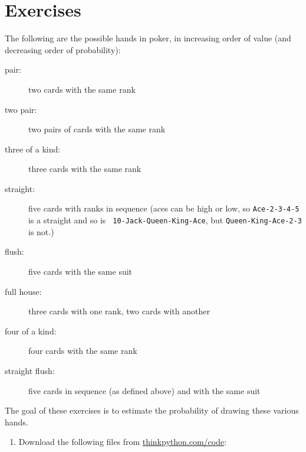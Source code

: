 \section{Exercises}

\begin{exercise}


The following are the possible hands in poker, in increasing order
of value (and decreasing order of probability):

\begin{description}

\item[pair:] two cards with the same rank
\vspace{-0.05in}

\item[two pair:] two pairs of cards with the same rank
\vspace{-0.05in}

\item[three of a kind:] three cards with the same rank
\vspace{-0.05in}

\item[straight:] five cards with ranks in sequence (aces can
be high or low, so {\tt Ace-2-3-4-5} is a straight and so is {\tt
10-Jack-Queen-King-Ace}, but {\tt Queen-King-Ace-2-3} is not.)
\vspace{-0.05in}

\item[flush:] five cards with the same suit
\vspace{-0.05in}

\item[full house:] three cards with one rank, two cards with another
\vspace{-0.05in}

\item[four of a kind:] four cards with the same rank
\vspace{-0.05in}

\item[straight flush:] five cards in sequence (as defined above) and
with the same suit
\vspace{-0.05in}

\end{description}
%
The goal of these exercises is to estimate
the probability of drawing these various hands.

\begin{enumerate}

\item Download the following files from \url{thinkpython.com/code}:


\end{enumerate}
\end{exercise}
